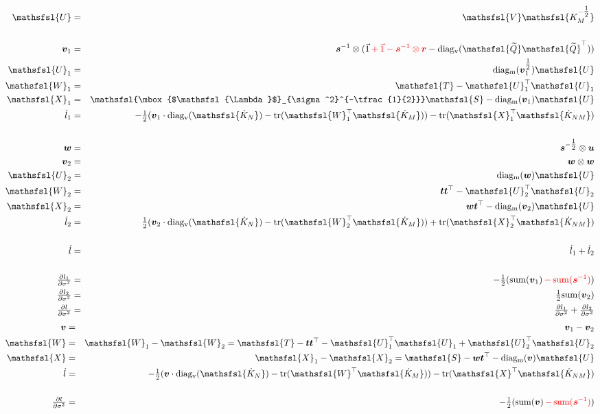 \documentclass[10pt]{article}
\newcommand{\red}{\textcolor{red}}
\newcommand{\blue}{\textcolor{blue}}
\newcommand{\onehalf}{\tfrac{1}{2}}
\newcommand{\mat}[1]{\mbox{$\mathsfsl{#1}$}}
\newcommand{\myvec}[1]{\mbox{\boldmath$#1$}}
\newcommand{\diagv}[1]{\mathrm{diag_v}(#1)}
\newcommand{\diagm}[1]{\mathrm{diag_m}(#1)}
\newcommand{\trace}[1]{\mathrm{tr}(#1)}
\newcommand{\transv}[1]{\myvec{#1}^\top}
\newcommand{\transm}[1]{\mat{#1}^\top}
\newcommand{\ichol}[1]{\mat{#1^{-\onehalf}}}
\newcommand{\dKm}{\mat{\dot{K}_M}}
\newcommand{\dKn}{\mat{\dot{K}_N}}
\newcommand{\dKnm}{\mat{\dot{K}_{NM}}}
\newcommand{\dl}{\dot{l}}
\newcommand{\vecu}{\myvec{u}}
\newcommand{\vecr}{\myvec{r}}
\newcommand{\vect}{\myvec{t}}
\newcommand{\vecw}{\myvec{w}}
\newcommand{\vecv}{\myvec{v}}
\newcommand{\vecvx}{\myvec{v}_1}
\newcommand{\vecvy}{\myvec{v}_2}
\newcommand{\vecis}{\myvec{s}^{-1}}
\newcommand{\veciss}{\myvec{s}^{-\onehalf}}
\newcommand{\matQn}{\mat{\widetilde{Q}}}
\newcommand{\tmatQn}{\transm{\widetilde{Q}}}
\newcommand{\matS}{\mat{S}}
\newcommand{\matT}{\mat{T}}
\newcommand{\matU}{\mat{U}}
\newcommand{\matUx}{\mat{U}_1}
\newcommand{\matUy}{\mat{U}_2}
\newcommand{\matW}{\mat{W}}
\newcommand{\matWx}{\mat{W}_1}
\newcommand{\matX}{\mat{X}}
\newcommand{\matXx}{\mat{X}_1}
\newcommand{\matWy}{\mat{W}_2}
\newcommand{\matXy}{\mat{X}_2}
\newcommand{\Lamss}{\mat{\Lambda}_{\sigma^2}}
\begin{document}
\begin{eqnarray*}
\matU & = & \mat{V} \ichol{K_M} \\
\\
\vecvx & = & \vecis \otimes (\vec{1} \red{\, + \, \vec{1} - \vecis \otimes \vecr} - \diagv{\matQn\tmatQn}) \\
\matUx & = & \diagm{\vecvx^{\onehalf}} \matU \\
\matWx & = & \matT - \matUx^\top\matUx \\
\matXx & = & \ichol{\Lamss}\matS - \diagm{\vecvx}\matU \\
\dl_1 & = & -\onehalf(\vecvx \cdot \diagv{\dKn} - \trace{\transm{W}_1\dKm}) - \trace{\transm{X}_1\dKnm} \\
\\
\vecw & = & \veciss \otimes \vecu \\
\vecvy & = & \vecw \otimes \vecw \\
\matUy & = & \diagm{\vecw} \matU \\
\matWy & = & \vect \vect^\top - \matUy^\top\matUy \\
\matXy & = & \vecw\vect^\top - \diagm{\vecvy}\matU \\
\dl_2 & = & \onehalf(\vecvy \cdot \diagv{\dKn} - \trace{\transm{W}_2\dKm}) + \trace{\transm{X}_2\dKnm} \\
\\
\dl & = & \dl_1 + \dl_2 \\
\\
\tfrac{\partial l_1}{\partial\sigma^2} & = & -\onehalf(\mathrm{sum}(\vecvx) \red{\, - \, \mathrm{sum}(\vecis)}) \\
\tfrac{\partial l_2}{\partial\sigma^2} & = & \onehalf\mathrm{sum}(\vecvy) \\
\tfrac{\partial l}{\partial\sigma^2} & = & \tfrac{\partial l_1}{\partial\sigma^2} + \tfrac{\partial l_2}{\partial\sigma^2}
\end{eqnarray*}
\blue{
\begin{eqnarray*}
\vecv & = & \vecvx - \vecvy  \\
\matW & = & \matWx - \matWy = \matT - \vect \transv{t} - \matUx^\top\matUx + \matUy^\top\matUy \\
\matX & = & \matXx - \matXy = \matS - \vecw \transv{t} - \diagm{\vecv}\matU \\
\dl & = & -\onehalf(\vecv \cdot \diagv{\dKn} - \trace{\transm{W}\dKm}) - \trace{\transm{X}\dKnm} \\
\\
\tfrac{\partial l}{\partial\sigma^2} & = & -\onehalf(\mathrm{sum}(\vecv) \red{\, - \, \mathrm{sum}(\vecis)}) \\
\end{eqnarray*}
}
\end{document}
